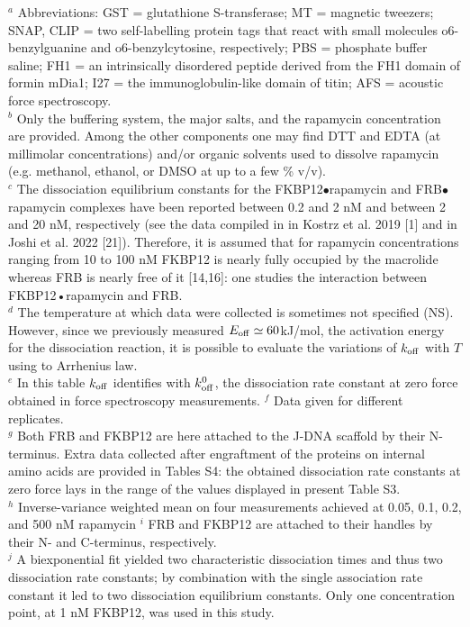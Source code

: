 \documentclass{biophys-new}
\begin{document}
\noindent
$^a$ Abbreviations: GST = glutathione S-transferase; MT = magnetic tweezers; SNAP, CLIP = two self-labelling protein tags that react with small molecules o6-benzylguanine and o6-benzylcytosine, respectively; PBS = phosphate buffer saline; FH1 = an intrinsically disordered peptide derived from the FH1 domain of formin mDia1; I27 = the immunoglobulin-like domain of titin; AFS = acoustic force spectroscopy.\\
$^b$ Only the buffering system, the major salts, and the rapamycin concentration are provided. Among the other components one may find DTT and EDTA (at millimolar concentrations) and/or organic solvents used to dissolve rapamycin (e.g. methanol, ethanol, or DMSO at up to a few \% v/v).\\
$^c$ The dissociation equilibrium constants for the FKBP12$\bullet$rapamycin and FRB$\bullet$rapamycin complexes have been reported between  0.2 and 2 nM and between 2 and 20 nM, respectively (see the data compiled in in Kostrz et al. 2019 [1] and in Joshi et al. 2022 [21]). %
Therefore, it is assumed that for rapamycin concentrations ranging from 10 to 100 nM FKBP12 is nearly fully occupied by the macrolide whereas FRB is nearly free of it [14,16]: one studies the interaction between FKBP12•rapamycin and FRB.\\
$^d$ The temperature at which data were collected is sometimes not specified (NS). However, since we previously measured $E_{\rm off} \simeq 60$kJ/mol, the activation energy for the dissociation reaction, it is possible to evaluate the variations of $k_{\rm off}$  with $T$ using to Arrhenius law.\\%
$^e$ In this table $k_{\rm off}$ identifies with $k^0_{\rm off}$, the dissociation rate constant at zero force obtained in force spectroscopy measurements.
$^f$ Data given for different replicates.\\
$^g$ Both FRB and FKBP12 are here attached to the J-DNA scaffold by their N-terminus. Extra data collected after engraftment of the proteins on internal amino acids are provided in Tables S4: the obtained dissociation rate constants at zero force lays in the range of the values displayed in present Table S3.\\
$^h$ Inverse-variance weighted mean on four measurements achieved at 0.05, 0.1, 0.2, and 500 nM rapamycin
$^i$ FRB and FKBP12 are attached to their handles by their N- and C-terminus, respectively.\\
$^j$ A biexponential fit yielded two characteristic dissociation times and thus two dissociation rate constants; by combination with the single association rate constant it led to two dissociation equilibrium constants. Only one concentration point, at 1 nM FKBP12, was used in this study.\\
\end{document}
